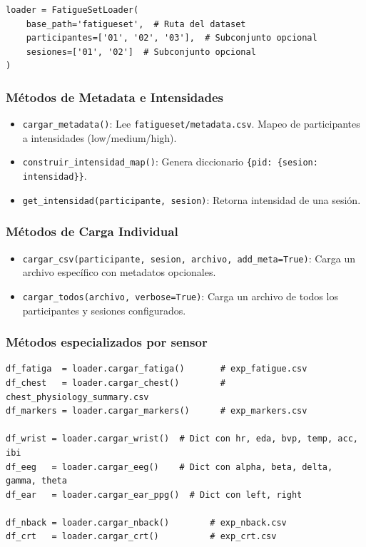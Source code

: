 \documentclass[12pt,a4paper]{article}
\begin{document}
\begin{lstlisting}
loader = FatigueSetLoader(
    base_path='fatigueset',  # Ruta del dataset
    participantes=['01', '02', '03'],  # Subconjunto opcional
    sesiones=['01', '02']  # Subconjunto opcional
)
\end{lstlisting}

\subsubsection{Métodos de Metadata e Intensidades}

\begin{itemize}
    \item \texttt{cargar\_metadata()}: Lee \texttt{fatigueset/metadata.csv}. Mapeo de participantes a intensidades (low/medium/high).
    \item \texttt{construir\_intensidad\_map()}: Genera diccionario \texttt{\{pid: \{sesion: intensidad\}\}}.
    \item \texttt{get\_intensidad(participante, sesion)}: Retorna intensidad de una sesión.
\end{itemize}

\subsubsection{Métodos de Carga Individual}

\begin{itemize}
    \item \texttt{cargar\_csv(participante, sesion, archivo, add\_meta=True)}: Carga un archivo específico con metadatos opcionales.
    \item \texttt{cargar\_todos(archivo, verbose=True)}: Carga un archivo de todos los participantes y sesiones configurados.
\end{itemize}

\subsubsection{Métodos especializados por sensor}

\begin{lstlisting}
df_fatiga  = loader.cargar_fatiga()       # exp_fatigue.csv
df_chest   = loader.cargar_chest()        # chest_physiology_summary.csv
df_markers = loader.cargar_markers()      # exp_markers.csv

df_wrist = loader.cargar_wrist()  # Dict con hr, eda, bvp, temp, acc, ibi
df_eeg   = loader.cargar_eeg()    # Dict con alpha, beta, delta, gamma, theta
df_ear   = loader.cargar_ear_ppg()  # Dict con left, right

df_nback = loader.cargar_nback()        # exp_nback.csv
df_crt   = loader.cargar_crt()          # exp_crt.csv
\end{lstlisting}
\end{document}
